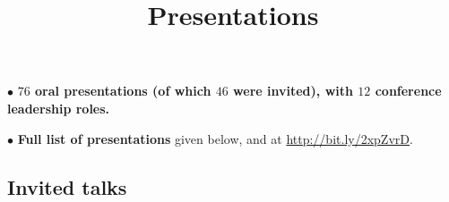 \documentclass[11pt,letterpaper,sans]{moderncv}
\title{\huge{Presentations}}
\begin{document}
\makecvtitle 



$\bullet$ \textbf{$76$ oral presentations (of which $46$ were invited), with $12$ conference leadership roles.}


$\bullet$ \textbf{Full list of presentations} given below, and at {\color{color1} \href{http://bit.ly/2xpZvrD}{http://bit.ly/2xpZvrD}}. \vspace{0.2cm}

\vspace{0.4cm}
\subsection{Invited talks} \vspace{-0.6cm}
\end{document}
